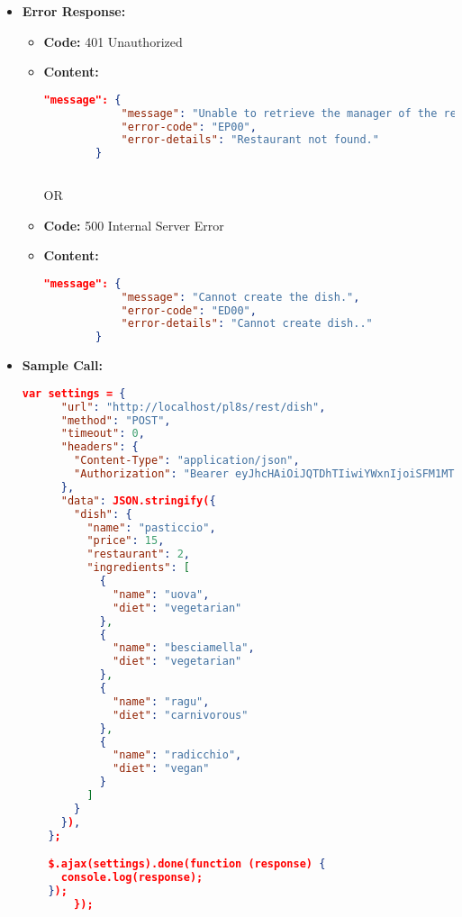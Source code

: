 \begin{itemize}
    \item \textbf{Error Response:}
    	\begin{itemize}
			\item[$\circ$] \textbf{Code:} 401 Unauthorized
			\item[] \textbf{Content:}
			\begin{lstlisting}[language=json]	
		 "message": {
			"message": "Unable to retrieve the manager of the restaurant that serves this dish.",
			"error-code": "EP00",
			"error-details": "Restaurant not found."
		}
	
			\end{lstlisting}
OR
			\item[$\circ$] \textbf{Code:} 500 Internal Server Error
			\item[] \textbf{Content:}
			\begin{lstlisting}[language=json]
		"message": {
			"message": "Cannot create the dish.",
			"error-code": "ED00",
			"error-details": "Cannot create dish.."
		}
			\end{lstlisting}
		\end{itemize}
    \item \textbf{Sample Call:}
		\begin{lstlisting}[language=json]
    var settings = {
      "url": "http://localhost/pl8s/rest/dish",
      "method": "POST",
      "timeout": 0,
      "headers": {
        "Content-Type": "application/json",
        "Authorization": "Bearer eyJhcHAiOiJQTDhTIiwiYWxnIjoiSFM1MTIifQ.eyJ1aWQiOjIsInJvbCI6Im1hbmFnZXIiLCJz dHIiOiJjdXNfUHc4cUNVWTg4V2gyMG4iLCJkYXQiOjE3MTQyODE5NjEwNzV9.aQ-zURTFf9g7D8 5NxijemKgeKmdnfyTPFL2XmpqwoDJCgirZv1P_7sZ4SsXcZ8UjN_ONSSyYwG98SvyxvorNdg"	
      },
      "data": JSON.stringify({
        "dish": {
          "name": "pasticcio",
          "price": 15,
          "restaurant": 2,
          "ingredients": [
            {
              "name": "uova",
              "diet": "vegetarian"
            },
            {
              "name": "besciamella",
              "diet": "vegetarian"
            },
            {
              "name": "ragu",
              "diet": "carnivorous"
            },
            {
              "name": "radicchio",
              "diet": "vegan"
            }
          ]
        }
      }),
    };

    $.ajax(settings).done(function (response) {
      console.log(response);
    });
		});				
		\end{lstlisting}
    
\end{itemize}
